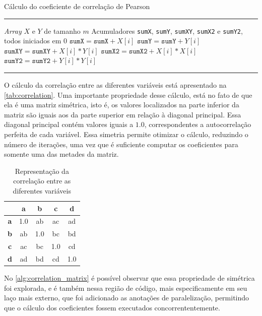 \begin{algorithm}[htb]
	\caption{Cálculo do coeficiente de correlação de Pearson}
	\label{alg:correlation}
	\hrule
	\begin{algorithmic}[1]
		\REQUIRE \textit{Array} $X$ e $Y$ de tamanho $m$
		\REQUIRE Acumuladores \texttt{sumX}, \texttt{sumY}, \texttt{sumXY}, \texttt{sumX2} e \texttt{sumY2}, todos iniciados em $0$
		\STATE $\texttt{sumX} = \texttt{sumX} + X[i]$
		\STATE $\texttt{sumY} = \texttt{sumY} + Y[i]$
		\STATE $\texttt{sumXY} = \texttt{sumXY} + X[i] * Y[i]$
		\STATE $\texttt{sumX2} = \texttt{sumX2} + X[i] * X[i]$
		\STATE $\texttt{sumY2} = \texttt{sumY2} + Y[i] * Y[i]$
		\ENDFOR
	\end{algorithmic}
	\hrule
	\fonte{}
\end{algorithm}

O cálculo da correlação entre as diferentes variáveis está apresentado na \autoref{tab:correlation}. Uma importante propriedade desse cálculo, está no fato de que ela é uma matriz simétrica, isto é, os valores localizados na parte inferior da matriz são iguais aos da parte superior em relação à diagonal principal. Essa diagonal principal contém valores iguais a $1.0$, correspondentes a autocorrelação perfeita de cada variável. Essa simetria permite otimizar o cálculo, reduzindo o número de iterações, uma vez que é suficiente computar os coeficientes para somente uma das metades da matriz.

\begin{table}[htb]
	\centering
	\begin{tabular}{|c|c|c|c|c|}
		\hline
		           & \textbf{a} & \textbf{b} & \textbf{c} & \textbf{d} \\
		\hline
		\textbf{a} & 1.0        & ab         & ac         & ad         \\
		\hline
		\textbf{b} & ab         & 1.0        & bc         & bd         \\
		\hline
		\textbf{c} & ac         & bc         & 1.0        & cd         \\
		\hline
		\textbf{d} & ad         & bd         & cd         & 1.0        \\
		\hline
	\end{tabular}
	\caption{Representação da correlação entre as diferentes variáveis}
	\fonte{}
	\label{tab:correlation}
\end{table}

No \autoref{alg:correlation_matrix} é possível observar que essa propriedade de simétrica foi explorada, e é também nessa região de código, mais especificamente em seu laço mais externo, que foi adicionado as anotações de paralelização, permitindo que o cálculo dos coeficientes fossem executados concorrententemente.

